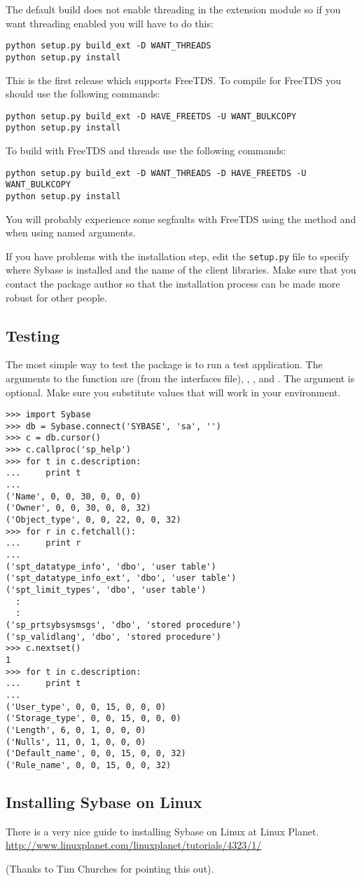 The default build does not enable threading in the extension module so
if you want threading enabled you will have to do this:

\begin{verbatim}
python setup.py build_ext -D WANT_THREADS
python setup.py install
\end{verbatim}

This is the first release which supports FreeTDS.  To compile for
FreeTDS you should use the following commands:

\begin{verbatim}
python setup.py build_ext -D HAVE_FREETDS -U WANT_BULKCOPY
python setup.py install
\end{verbatim}

To build with FreeTDS and threads use the following commands:

\begin{verbatim}
python setup.py build_ext -D WANT_THREADS -D HAVE_FREETDS -U WANT_BULKCOPY
python setup.py install
\end{verbatim}

You will probably experience some segfaults with FreeTDS using the
  method and when using named
arguments.

If you have problems with the installation step, edit the
\texttt{setup.py} file to specify where Sybase is installed and the
name of the client libraries.  Make sure that you contact the package
author so that the installation process can be made more robust for
other people.

\subsection{Testing}

The most simple way to test the  package is to run a
test application.  The arguments to the 
function are  (from the interfaces file), ,
, and .  The  argument is
optional.  Make sure you substitute values that will work in your
environment.

\begin{verbatim}
>>> import Sybase
>>> db = Sybase.connect('SYBASE', 'sa', '')
>>> c = db.cursor()
>>> c.callproc('sp_help')
>>> for t in c.description:
...     print t
... 
('Name', 0, 0, 30, 0, 0, 0)
('Owner', 0, 0, 30, 0, 0, 32)
('Object_type', 0, 0, 22, 0, 0, 32)
>>> for r in c.fetchall():
...     print r
... 
('spt_datatype_info', 'dbo', 'user table')
('spt_datatype_info_ext', 'dbo', 'user table')
('spt_limit_types', 'dbo', 'user table')
  :
  :
('sp_prtsybsysmsgs', 'dbo', 'stored procedure')
('sp_validlang', 'dbo', 'stored procedure')
>>> c.nextset()
1
>>> for t in c.description:
...     print t
... 
('User_type', 0, 0, 15, 0, 0, 0)
('Storage_type', 0, 0, 15, 0, 0, 0)
('Length', 6, 0, 1, 0, 0, 0)
('Nulls', 11, 0, 1, 0, 0, 0)
('Default_name', 0, 0, 15, 0, 0, 32)
('Rule_name', 0, 0, 15, 0, 0, 32)
\end{verbatim}

\subsection{Installing Sybase on Linux}

There is a very nice guide to installing Sybase on Linux at Linux
Planet.  \url{http://www.linuxplanet.com/linuxplanet/tutorials/4323/1/}

(Thanks to Tim Churches for pointing this out).
